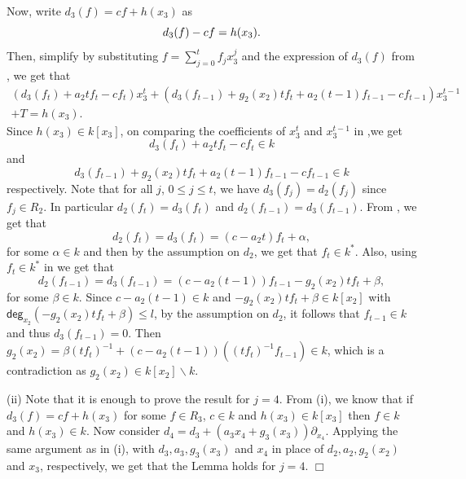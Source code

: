 \documentclass[12pt,reqno]{amsart}
\renewcommand{\deg}{\mathsf{deg}}
\renewcommand{\setminus}{\smallsetminus}
\renewcommand{\leq}{\leqslant}
\numberwithin{thm}{section}
\theoremstyle{definition}
\numberwithin{equation}{thm}
\renewenvironment{proof}{\par\noindent {\em Proof:}}{\hfill$\Box$\medskip}
\theoremstyle{plain}
\begin{document}
\begin{proof}
	Now, write $d_{3}(f)=cf+h(x_{3})$ as \begin{equation}\label{eqn-d_{3}}
	    d_{3}(f)-cf=h(x_{3}).
	\end{equation} Then, simplify  by substituting $f=\sum_{j=0}^{t}f_jx_{3}^j$ and the expression of $d_{3}(f)$ from , we get that
    \begin{align}\label{eqn-two}
        (d_{3}(f_t)+a_2tf_t-cf_t)x_{3}^t+(d_{3}(f_{t-1})+g_2(x_2)tf_t+a_2(t-1)f_{t-1}-cf_{t-1})x_{3}^{t-1} \nonumber\\
        + T=h(x_{3}).
    \end{align}
    Since $h(x_{3})\in k[x_{3}]$, on comparing the coefficients of $x_{3}^t$ and $x_{3}^{t-1}$ in ,we get \begin{equation}\label{one}
		d_{3}(f_t)+a_2tf_t-cf_t\in k \end{equation} and
	\begin{equation}\label{two}
 d_{3}(f_{t-1})+g_2(x_2)tf_t+a_2(t-1)f_{t-1}-cf_{t-1}\in k
	\end{equation} respectively.
	Note that for all $j$, $ 0\leq j\leq t$, we have $d_{3}(f_{j})=d_{2}(f_{j})$ since $f_j\in R_{2}$. In particular $d_2(f_t)=d_{3}(f_t)$ and $d_{2}(f_{t-1})=d_{3}(f_{t-1})$. From , we get that 
	\begin{equation}\label{eqn lem no units}
	    d_2(f_t)=d_{3}(f_t)=(c-a_2t)f_t+\alpha,
	\end{equation}
 for some $\alpha \in k$ and then by the assumption on $d_2$, we get that $f_t\in k^{\ast}$. Also, using $f_t\in k^{\ast}$ in  we get that \[d_{2}(f_{t-1})=d_{3}(f_{t-1})=(c-a_2(t-1))f_{t-1}-g_2(x_2)tf_t+\beta,\] for some $\beta \in k$. 
	Since $c-a_2(t-1)\in k$ and $-g_2(x_2)tf_t+\beta\in k[x_2]$ with $\deg_{x_2}(-g_2(x_2)tf_t+\beta)\leq l$, by the assumption on $d_2$, it follows that $f_{t-1}\in k$ and thus $d_{3}(f_{t-1})=0$. Then $g_2(x_2)=\beta(tf_t)^{-1}+(c-a_2(t-1))((tf_t)^{-1}f_{t-1})\in k$, which is a contradiction as $g_2(x_2)\in k[x_2]\setminus k$. 
	
	(ii) Note that it is enough to prove the result for $j=4$. From (i), we know that if $d_3(f)=cf+h(x_3)$ for some $f\in R_3$, $c\in k$ and $h(x_3)\in k[x_3]$ then $f\in k$ and $h(x_3)\in k.$ Now consider $d_4=d_3+(a_3x_4+g_3(x_3))\partial_{x_4}.$ Applying the same argument as in (i), with $d_3,a_3,g_3(x_3)$ and $x_4$ in place of $d_2,a_2,g_2(x_2)$ and $x_3$, respectively, we get that the Lemma holds for $j=4.$
\end{proof}  
\end{document}
